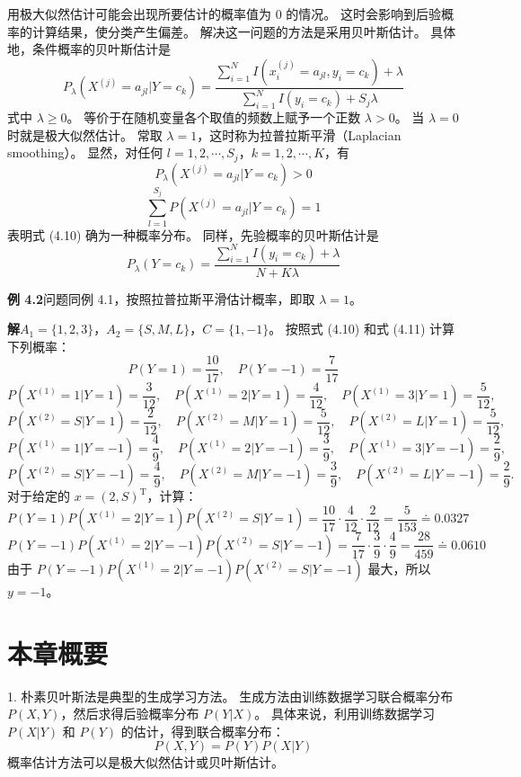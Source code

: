 \documentclass[UTF8,12pt,a4paper,fontset=fandol]{ctexart}
\begin{document}
用极大似然估计可能会出现所要估计的概率值为 $0$ 的情况。
这时会影响到后验概率的计算结果，使分类产生偏差。
解决这一问题的方法是采用贝叶斯估计。
具体地，条件概率的贝叶斯估计是
\begin{equation}
  P_\lambda(X^{(j)}=a_{jl}|Y=c_k)
  =
  \frac{\sum_{i=1}^N I(x_i^{(j)}=a_{jl},y_i=c_k)+\lambda}
       {\sum_{i=1}^N I(y_i=c_k)+S_j\lambda}
  \tag{4.10}
\end{equation}
式中 $\lambda\ge 0$。
等价于在随机变量各个取值的频数上赋予一个正数 $\lambda>0$。
当 $\lambda=0$ 时就是极大似然估计。
常取 $\lambda=1$，这时称为拉普拉斯平滑（Laplacian smoothing）。
显然，对任何 $l=1,2,\cdots,S_j$，$k=1,2,\cdots,K$，有
\[
  P_\lambda(X^{(j)}=a_{jl}|Y=c_k)>0
\]
\[
  \sum_{l=1}^{S_j}P(X^{(j)}=a_{jl}|Y=c_k)=1
\]
表明式 (4.10) 确为一种概率分布。
同样，先验概率的贝叶斯估计是
\begin{equation}
  P_\lambda(Y=c_k)=
  \frac{\sum_{i=1}^N I(y_i=c_k)+\lambda}
       {N+K\lambda}
  \tag{4.11}
\end{equation}

\noindent\textbf{例 4.2}\quad 问题同例 4.1，按照拉普拉斯平滑估计概率，即取 $\lambda=1$。

\noindent\textbf{解}\quad $A_1=\{1,2,3\}$，$A_2=\{S,M,L\}$，$C=\{1,-1\}$。
按照式 (4.10) 和式 (4.11) 计算下列概率：
\[
  P(Y=1)=\frac{10}{17},\quad P(Y=-1)=\frac{7}{17}
\]
\[
  P(X^{(1)}=1|Y=1)=\frac{3}{12},\quad
  P(X^{(1)}=2|Y=1)=\frac{4}{12},\quad
  P(X^{(1)}=3|Y=1)=\frac{5}{12},
\]
\[
  P(X^{(2)}=S|Y=1)=\frac{2}{12},\quad
  P(X^{(2)}=M|Y=1)=\frac{5}{12},\quad
  P(X^{(2)}=L|Y=1)=\frac{5}{12},
\]
\[
  P(X^{(1)}=1|Y=-1)=\frac{4}{9},\quad
  P(X^{(1)}=2|Y=-1)=\frac{3}{9},\quad
  P(X^{(1)}=3|Y=-1)=\frac{2}{9},
\]
\[
  P(X^{(2)}=S|Y=-1)=\frac{4}{9},\quad
  P(X^{(2)}=M|Y=-1)=\frac{3}{9},\quad
  P(X^{(2)}=L|Y=-1)=\frac{2}{9}.
\]
对于给定的 $x=(2,S)^{\mathrm{T}}$，计算：
\[
  P(Y=1)P(X^{(1)}=2|Y=1)P(X^{(2)}=S|Y=1)
  =\frac{10}{17}\cdot\frac{4}{12}\cdot\frac{2}{12}
  =\frac{5}{153}\doteq 0.0327
\]
\[
  P(Y=-1)P(X^{(1)}=2|Y=-1)P(X^{(2)}=S|Y=-1)
  =\frac{7}{17}\cdot\frac{3}{9}\cdot\frac{4}{9}
  =\frac{28}{459}\doteq 0.0610
\]
由于 $P(Y=-1)P(X^{(1)}=2|Y=-1)P(X^{(2)}=S|Y=-1)$ 最大，所以 $y=-1$。

\section*{本章概要}

1. 朴素贝叶斯法是典型的生成学习方法。
生成方法由训练数据学习联合概率分布 $P(X,Y)$，然后求得后验概率分布 $P(Y|X)$。
具体来说，利用训练数据学习 $P(X|Y)$ 和 $P(Y)$ 的估计，得到联合概率分布：
\[
  P(X,Y)=P(Y)P(X|Y)
\]
概率估计方法可以是极大似然估计或贝叶斯估计。
\end{document}
